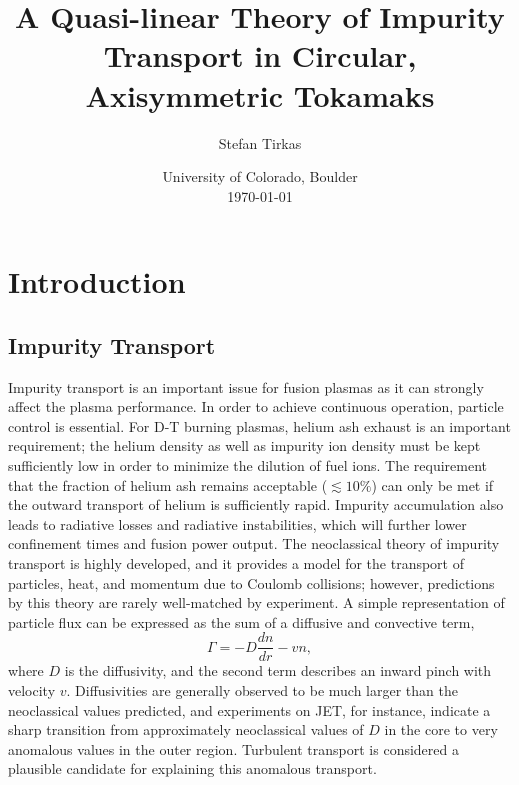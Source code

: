 \documentclass[12pt]{article}
\numberwithin{equation}{subsection}
\begin{document}
\title{A Quasi-linear Theory of Impurity Transport in Circular, Axisymmetric Tokamaks}
\author{Stefan Tirkas}


\date{University of Colorado, Boulder\\[2ex]%
      \today}

\maketitle

\newpage{}

\tableofcontents

\newpage{}

\section{Introduction}

\subsection{Impurity Transport}
   \quad Impurity transport is an important issue for fusion plasmas as it can strongly affect the plasma performance.
In order to achieve continuous operation, particle control is essential\cite{ITER}. For D-T burning plasmas, helium ash exhaust is
an important requirement; the helium density as well as impurity ion density must be kept sufficiently low in order to
minimize the dilution of fuel ions. The requirement that the fraction of helium ash remains acceptable ($\lesssim 10\%$) can
only be met if the outward transport of helium is sufficiently rapid\cite{WessonA}. Impurity accumulation also leads to radiative
losses and radiative instabilities, which will further lower confinement times and fusion power output. The neoclassical theory of
impurity transport is highly developed, and it provides a model for the transport of particles, heat, and momentum due to Coulomb
collisions; however, predictions by this theory are rarely well-matched by experiment. A simple representation of particle flux can
be expressed as the sum of a diffusive and convective term,
   \begin{equation}
      \Gamma = -D\frac{dn}{dr} - vn,
   \end{equation}
where $D$ is the diffusivity, and the second term describes an inward pinch with velocity $v$. Diffusivities are generally observed
to be much larger than the neoclassical values predicted, and experiments on JET, for instance, indicate a sharp transition from
approximately neoclassical values of $D$ in the core to very anomalous values in the outer region\cite{WessonB}. Turbulent transport
is considered a plausible candidate for explaining this anomalous transport.
\end{document}
